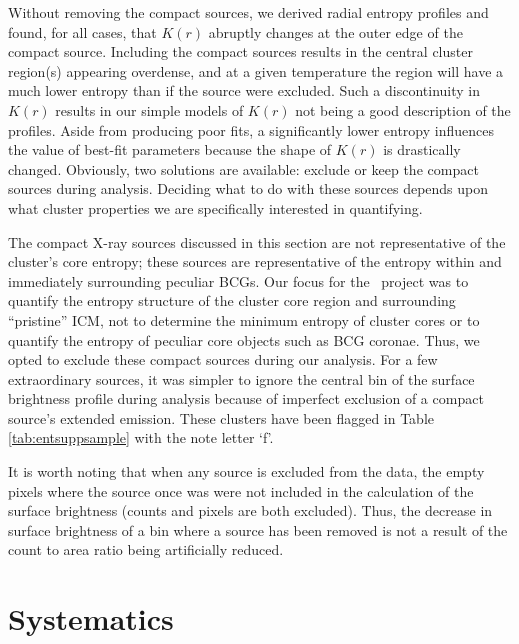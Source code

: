 Without removing the compact sources, we derived radial entropy
profiles and found, for all cases, that $K(r)$ abruptly changes at the
outer edge of the compact source. Including the compact sources
results in the central cluster region(s) appearing overdense, and at a
given temperature the region will have a much lower entropy than if
the source were excluded. Such a discontinuity in $K(r)$ results in
our simple models of $K(r)$ not being a good description of the
profiles. Aside from producing poor fits, a significantly lower
entropy influences the value of best-fit parameters because the shape
of $K(r)$ is drastically changed. Obviously, two solutions are
available: exclude or keep the compact sources during analysis.
Deciding what to do with these sources depends upon what cluster
properties we are specifically interested in quantifying.

The compact X-ray sources discussed in this section are not
representative of the cluster's core entropy; these sources are
representative of the entropy within and immediately surrounding
peculiar BCGs. Our focus for the \accept\ project was to quantify the
entropy structure of the cluster core region and surrounding
``pristine'' ICM, not to determine the minimum entropy of cluster
cores or to quantify the entropy of peculiar core objects such as BCG
coronae. Thus, we opted to exclude these compact sources during our
analysis. For a few extraordinary sources, it was simpler to ignore
the central bin of the surface brightness profile during analysis
because of imperfect exclusion of a compact source's extended
emission. These clusters have been flagged in Table \ref{tab:entsuppsample}
with the note letter `f'.

It is worth noting that when any source is excluded from the data, the
empty pixels where the source once was were not included in the
calculation of the surface brightness (counts and pixels are both
excluded). Thus, the decrease in surface brightness of a bin where a
source has been removed is not a result of the count to area ratio
being artificially reduced.

\section{Systematics}
\label{sec:entsuppsys}

